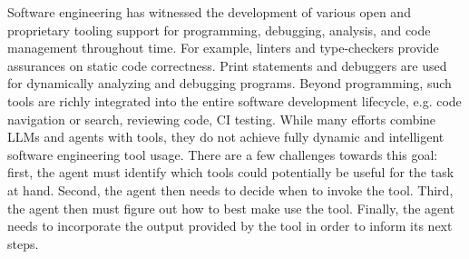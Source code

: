 Software engineering has witnessed the development of various open and proprietary tooling support for programming, debugging, analysis, and code management throughout time.
For example, linters and type-checkers provide assurances on static code correctness. 
Print statements and debuggers are used for dynamically analyzing and debugging programs.
Beyond programming, such tools are richly integrated into the entire software development lifecycle, e.g. code navigation or search, reviewing code, CI testing.
While many efforts combine LLMs and agents with tools, they do not achieve fully dynamic and intelligent software engineering tool usage. There are a few challenges towards this goal: first, the agent must identify which tools could potentially be useful for the task at hand. Second, the agent then needs to decide when to invoke the tool. Third, the agent then must figure out how to best make use the tool. Finally, the agent needs to incorporate the output provided by the tool in order to inform its next steps.





